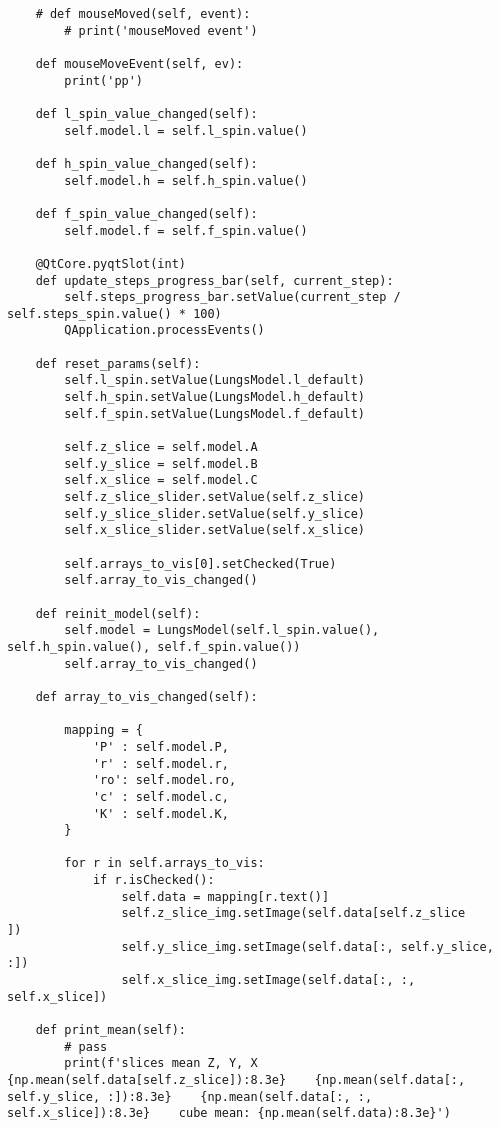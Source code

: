 \documentclass[../main.tex]{subfiles}
\begin{document}
\begin{lstlisting}
    # def mouseMoved(self, event):
        # print('mouseMoved event')

    def mouseMoveEvent(self, ev):
        print('pp')

    def l_spin_value_changed(self):
        self.model.l = self.l_spin.value()

    def h_spin_value_changed(self):
        self.model.h = self.h_spin.value()
    
    def f_spin_value_changed(self):
        self.model.f = self.f_spin.value()

    @QtCore.pyqtSlot(int)
    def update_steps_progress_bar(self, current_step):
        self.steps_progress_bar.setValue(current_step / self.steps_spin.value() * 100)
        QApplication.processEvents() 

    def reset_params(self):
        self.l_spin.setValue(LungsModel.l_default)
        self.h_spin.setValue(LungsModel.h_default)
        self.f_spin.setValue(LungsModel.f_default)

        self.z_slice = self.model.A
        self.y_slice = self.model.B
        self.x_slice = self.model.C
        self.z_slice_slider.setValue(self.z_slice)
        self.y_slice_slider.setValue(self.y_slice)
        self.x_slice_slider.setValue(self.x_slice)

        self.arrays_to_vis[0].setChecked(True)
        self.array_to_vis_changed()

    def reinit_model(self):
        self.model = LungsModel(self.l_spin.value(), self.h_spin.value(), self.f_spin.value())
        self.array_to_vis_changed()

    def array_to_vis_changed(self):
        
        mapping = {
            'P' : self.model.P,
            'r' : self.model.r,
            'ro': self.model.ro,
            'c' : self.model.c,
            'K' : self.model.K,
        }

        for r in self.arrays_to_vis:
            if r.isChecked():
                self.data = mapping[r.text()]
                self.z_slice_img.setImage(self.data[self.z_slice      ])
                self.y_slice_img.setImage(self.data[:, self.y_slice, :])
                self.x_slice_img.setImage(self.data[:, :, self.x_slice])

    def print_mean(self):
        # pass
        print(f'slices mean Z, Y, X   {np.mean(self.data[self.z_slice]):8.3e}    {np.mean(self.data[:, self.y_slice, :]):8.3e}    {np.mean(self.data[:, :, self.x_slice]):8.3e}    cube mean: {np.mean(self.data):8.3e}')


\end{lstlisting}
\end{document}
